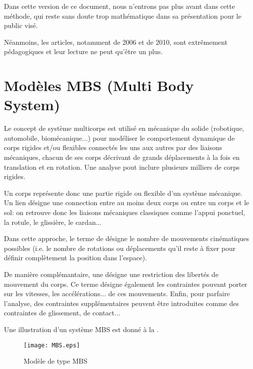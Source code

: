 \medskip
Dans cette version de ce document, nous n'entrons pas plus avant dans cette
méthode, qui reste sans doute trop mathématique dans sa présentation
pour le public visé.

Néanmoins, les articles, notamment de 2006 et de 2010, sont extrêmement
pédagogiques et leur lecture ne peut qu'être un plus.





\medskip
\section{Modèles MBS (Multi Body System)}\label{Sec-MBS}

Le concept de système multicorps est utilisé en mécanique du solide (robotique, automobile,
biomécanique...) pour modéliser le comportement dynamique de corps rigides et/ou flexibles 
connectés les uns aux autres par  des liaisons mécaniques, chacun de ses corps décrivant de 
grands déplacements à la fois en translation et en rotation. Une analyse pout inclure plusieurs 
milliers de corps rigides.

 

\medskip
Un corps représente donc une partie rigide ou flexible d'un système mécanique.
Un lien désigne une connection entre au moins deux corps ou entre un corps et le sol: 
on retrouve donc les liaisons mécaniques classiques comme l'appui ponctuel, la rotule,
le glissière, le cardan...

\medskip
Dans cette approche, le terme de  désigne le nombre de mouvements
cinématiques possibles (i.e. le nombre de rotations ou déplacements qu'il reste à fixer
pour définir complètement la position dans l'espace).

De manière complémantaire, une  désigne
une restriction des libertés de mouvement du corps. Ce terme désigne également les
contraintes pouvant porter sur les vitesses, les accélérations... de ces mouvements.
Enfin, pour parfaire l'analyse, des contraintes supplémentaires peuvent être introduites
comme des contraintes de glissement, de contact...

Une illustration d'un système MBS est donné à la .
\begin{figure}[htb]
\centerline{\texttt{[image: MBS.eps]}}
\caption{Modèle de type MBS}\label{Fig-MBS}
\end{figure}

